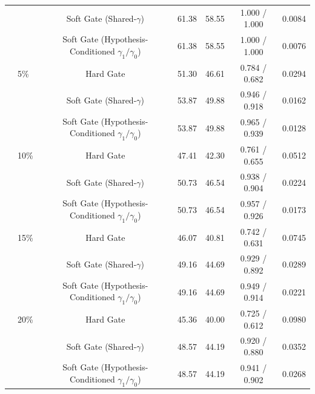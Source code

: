 \begin{table}[!t]
\begin{tabular}{llccccc}
 &  & Soft Gate (Shared-$\gamma$) & 61.38 & 58.55 & 1.000 / 1.000 & 0.0084 \\
 &  & Soft Gate (Hypothesis-Conditioned $\gamma_1/\gamma_0$) & 61.38 & 58.55 & 1.000 / 1.000 & 0.0076 \\
 & 5\% & Hard Gate & 51.30 & 46.61 & 0.784 / 0.682 & 0.0294 \\
 &  & Soft Gate (Shared-$\gamma$) & 53.87 & 49.88 & 0.946 / 0.918 & 0.0162 \\
 &  & Soft Gate (Hypothesis-Conditioned $\gamma_1/\gamma_0$) & 53.87 & 49.88 & 0.965 / 0.939 & 0.0128 \\
 & 10\% & Hard Gate & 47.41 & 42.30 & 0.761 / 0.655 & 0.0512 \\
 &  & Soft Gate (Shared-$\gamma$) & 50.73 & 46.54 & 0.938 / 0.904 & 0.0224 \\
 &  & Soft Gate (Hypothesis-Conditioned $\gamma_1/\gamma_0$) & 50.73 & 46.54 & 0.957 / 0.926 & 0.0173 \\
 & 15\% & Hard Gate & 46.07 & 40.81 & 0.742 / 0.631 & 0.0745 \\
 &  & Soft Gate (Shared-$\gamma$) & 49.16 & 44.69 & 0.929 / 0.892 & 0.0289 \\
 &  & Soft Gate (Hypothesis-Conditioned $\gamma_1/\gamma_0$) & 49.16 & 44.69 & 0.949 / 0.914 & 0.0221 \\
 & 20\% & Hard Gate & 45.36 & 40.00 & 0.725 / 0.612 & 0.0980 \\
 &  & Soft Gate (Shared-$\gamma$) & 48.57 & 44.19 & 0.920 / 0.880 & 0.0352 \\
 &  & Soft Gate (Hypothesis-Conditioned $\gamma_1/\gamma_0$) & 48.57 & 44.19 & 0.941 / 0.902 & 0.0268 \\
\bottomrule
\end{tabular}
\end{table}